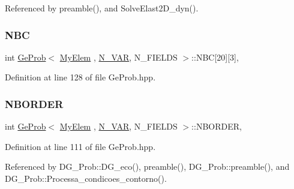 Referenced by preamble(), and Solve\+Elast2\+D\+\_\+dyn().

\mbox{\label{classGeProb_a5fb604ebcc5130a7ad4719d5f6578cb9}} 
\subsubsection{\texorpdfstring{N\+BC}{NBC}}
{\footnotesize\ttfamily int \hyperlink{classGeProb}{Ge\+Prob}$<$ \hyperlink{DG__Prob_8h_a83cd887ced9a6587428f267e50cd4787}{My\+Elem} , \hyperlink{classED__Prob_a4e7d2ff1a8e435e336fb00c527224b5a}{N\+\_\+\+V\+AR}, N\+\_\+\+F\+I\+E\+L\+DS $>$\+::N\+BC\mbox{[}20\mbox{]}\mbox{[}3\mbox{]}\hspace{0.3cm}{\ttfamily [protected]}, {\ttfamily [inherited]}}



Definition at line 128 of file Ge\+Prob.\+hpp.

\mbox{\label{classGeProb_a7ff7ce9c7e12c1bb099c41b7fdc91d7d}} 
\subsubsection{\texorpdfstring{N\+B\+O\+R\+D\+ER}{NBORDER}}
{\footnotesize\ttfamily int \hyperlink{classGeProb}{Ge\+Prob}$<$ \hyperlink{DG__Prob_8h_a83cd887ced9a6587428f267e50cd4787}{My\+Elem} , \hyperlink{classED__Prob_a4e7d2ff1a8e435e336fb00c527224b5a}{N\+\_\+\+V\+AR}, N\+\_\+\+F\+I\+E\+L\+DS $>$\+::N\+B\+O\+R\+D\+ER\hspace{0.3cm}{\ttfamily [protected]}, {\ttfamily [inherited]}}



Definition at line 111 of file Ge\+Prob.\+hpp.



Referenced by D\+G\+\_\+\+Prob\+::\+D\+G\+\_\+eco(), preamble(), D\+G\+\_\+\+Prob\+::preamble(), and D\+G\+\_\+\+Prob\+::\+Processa\+\_\+condicoes\+\_\+contorno().

\mbox{\label{classGeProb_a2894b14d50728f945721f2c85e1fba4d}} 
